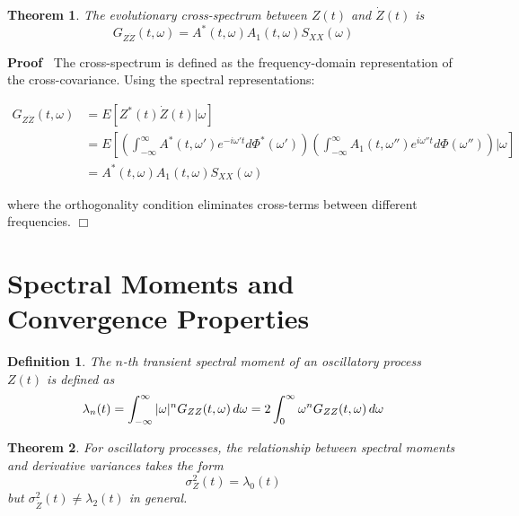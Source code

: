 \documentclass{article}
\newenvironment{proof}{\noindent\textbf{Proof\ }}{\hspace*{\fill}$\Box$\medskip}
\newtheorem{definition}{Definition}
\newtheorem{theorem}{Theorem}
\begin{document}
\begin{theorem}
  The evolutionary cross-spectrum between $Z (t)$ and $\dot{Z} (t)$ is
  \begin{equation}
    G_{Z \dot{Z}} (t, \omega) = A^{\ast} (t, \omega) A_1 (t, \omega) S_{XX}
    (\omega)
  \end{equation}
\end{theorem}

\begin{proof}
  The cross-spectrum is defined as the frequency-domain representation of the
  cross-covariance. Using the spectral representations:
  
  \begin{align}
    G_{Z \dot{Z}} (t, \omega) & = E [Z^{\ast} (t) \dot{Z} (t) | \omega] \\
    & = E \left[ \left( \int_{- \infty}^{\infty} A^{\ast} (t, \omega') e^{- i
    \omega' t} d \Phi^{\ast} (\omega') \right) \left( \int_{- \infty}^{\infty}
    A_1 (t, \omega'') e^{i \omega'' t} d \Phi (\omega'') \right) | \omega
    \right] \\
    & = A^{\ast} (t, \omega) A_1 (t, \omega) S_{XX} (\omega) 
  \end{align}
  
  where the orthogonality condition eliminates cross-terms between different
  frequencies.
\end{proof}

\section{Spectral Moments and Convergence Properties}

\begin{definition}
  The $n$-th transient spectral moment of an oscillatory process $Z (t)$ is
  defined as
  \begin{equation}
    \lambda_n (t) = \int_{- \infty}^{\infty} | \omega |^n G_{ZZ} (t, \omega) 
    \hspace{0.17em} d \omega = 2 \int_0^{\infty} \omega^n G_{ZZ} (t, \omega) 
    \hspace{0.17em} d \omega
  \end{equation}
\end{definition}

\begin{theorem}
  For oscillatory processes, the relationship between spectral moments and
  derivative variances takes the form
  \begin{equation}
    \sigma_Z^2 (t) = \lambda_0 (t)
  \end{equation}
  but $\sigma_{\dot{Z}}^2 (t) \neq \lambda_2 (t)$ in general.
\end{theorem}
\end{document}
